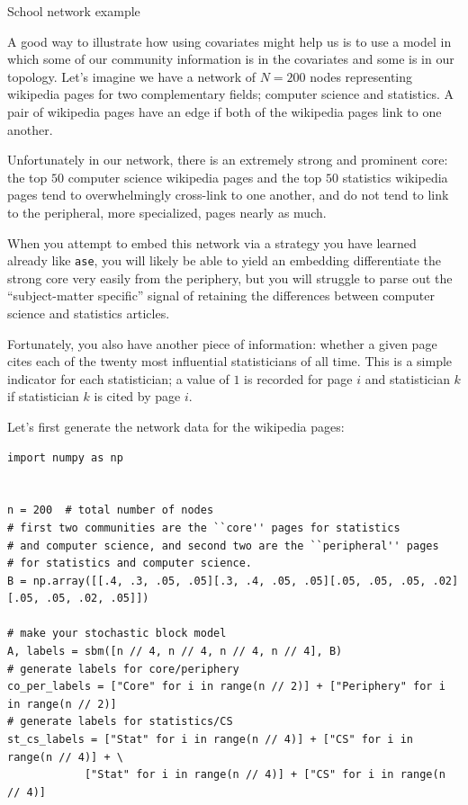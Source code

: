 \begin{floatingbox}[h]\caption{School network example}
A good way to illustrate how using covariates might help us is to use a model in which some of our community information is in the covariates and some is in our topology. Let's imagine we have a network of $N=200$ nodes representing wikipedia pages for two complementary fields; computer science and statistics. A pair of wikipedia pages have an edge if both of the wikipedia pages link to one another. 

Unfortunately in our network, there is an extremely strong and prominent core: the top $50$ computer science wikipedia pages and the top $50$ statistics wikipedia pages tend to overwhelmingly cross-link to one another, and do not tend to link to the peripheral, more specialized, pages nearly as much.

When you attempt to embed this network via a strategy you have learned already like \texttt{ase}, you will likely be able to yield an embedding differentiate the strong core very easily from the periphery, but you will struggle to parse out the ``subject-matter specific'' signal of retaining the differences between computer science and statistics articles.

Fortunately, you also have another piece of information: whether a given page cites each of the twenty most influential statisticians of all time. This is a simple indicator for each statistician; a value of $1$ is recorded for page $i$ and statistician $k$ if statistician $k$ is cited by page $i$.
\end{floatingbox}

Let's first generate the network data for the wikipedia pages:

\begin{lstlisting}[style=python]
import numpy as np


n = 200  # total number of nodes
# first two communities are the ``core'' pages for statistics
# and computer science, and second two are the ``peripheral'' pages
# for statistics and computer science.
B = np.array([[.4, .3, .05, .05][.3, .4, .05, .05][.05, .05, .05, .02][.05, .05, .02, .05]])

# make your stochastic block model
A, labels = sbm([n // 4, n // 4, n // 4, n // 4], B)
# generate labels for core/periphery
co_per_labels = ["Core" for i in range(n // 2)] + ["Periphery" for i in range(n // 2)]
# generate labels for statistics/CS
st_cs_labels = ["Stat" for i in range(n // 4)] + ["CS" for i in range(n // 4)] + \
            ["Stat" for i in range(n // 4)] + ["CS" for i in range(n // 4)]
\end{lstlisting}

